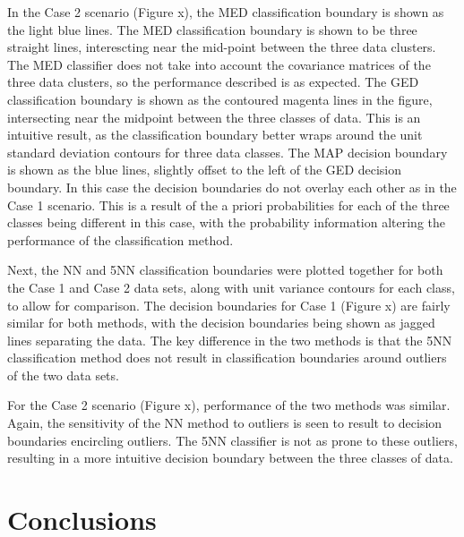 \documentclass[article, 1.5space, letterpaper, 12pt, oneside, header, footer]{SydeClass}
\begin{document}
In the Case 2 scenario (Figure x), the MED classification boundary is shown as the light blue lines. The MED classification boundary is shown to be three straight lines, interescting near the mid-point between the three data clusters. The MED classifier does not take into account the covariance matrices of the three data clusters, so the performance described is as expected. The GED classification boundary is shown as the contoured magenta lines in the figure, intersecting near the midpoint between the three classes of data. This is an intuitive result, as the classification boundary better wraps around the unit standard deviation contours for three data classes. The MAP decision boundary is shown as the blue lines, slightly offset to the left of the GED decision boundary. In this case the decision boundaries do not overlay each other as in the Case 1 scenario. This is a result of the a priori probabilities for each of the three classes being different in this case, with the probability information altering the performance of the classification method.

Next, the NN and 5NN classification boundaries were plotted together for both the Case 1 and Case 2 data sets, along with unit variance contours for each class, to allow for comparison. The decision boundaries for Case 1 (Figure x) are fairly similar for both methods, with the decision boundaries being shown as jagged lines separating the data. The key difference in the two methods is that the 5NN classification method does not result in classification boundaries around outliers of the two data sets.

For the Case 2 scenario (Figure x), performance of the two methods was similar. Again, the sensitivity of the NN method to outliers is seen to result to decision boundaries encircling outliers. The 5NN classifier is not as prone to these outliers, resulting in a more intuitive decision boundary between the three classes of data.



\section{Conclusions}






\end{document}
